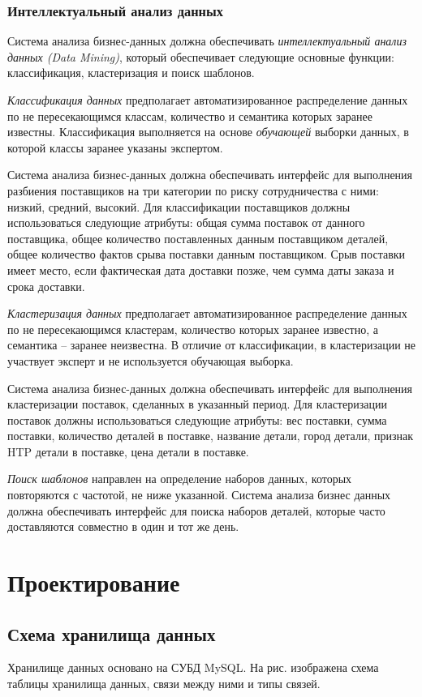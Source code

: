 \subsubsection{Интеллектуальный анализ данных}
Система анализа бизнес-данных должна обеспечивать \textit{интеллектуальный анализ данных (Data Mining)}, который обеспечивает следующие основные функции: классификация, кластеризация и поиск шаблонов.\par
\textit{Классификация данных} предполагает автоматизированное распределение данных по не пересекающимся классам, количество и семантика которых заранее известны. Классификация выполняется на основе \textit{обучающей} выборки данных, в которой классы заранее указаны экспертом.\par
Система анализа бизнес-данных должна обеспечивать интерфейс для выполнения разбиения поставщиков на три категории по риску сотрудничества с ними: низкий, средний, высокий. Для классификации поставщиков должны использоваться следующие атрибуты: общая сумма поставок от данного поставщика, общее количество поставленных данным поставщиком деталей, общее количество фактов срыва поставки данным поставщиком. Срыв поставки имеет место, если фактическая дата доставки позже, чем сумма даты заказа и срока доставки.\par
\textit{Кластеризация данных} предполагает автоматизированное распределение данных по не пересекающимся кластерам, количество которых заранее известно, а семантика – заранее неизвестна. В отличие от классификации, в кластеризации не участвует эксперт и не используется обучающая выборка.\par
Система анализа бизнес-данных должна обеспечивать интерфейс для выполнения кластеризации поставок, сделанных в указанный период. Для кластеризации поставок должны использоваться следующие атрибуты: вес поставки, сумма поставки, количество деталей в поставке, название детали, город детали, признак HTP детали в поставке, цена детали в поставке. \par
\textit{Поиск шаблонов} направлен на определение наборов данных, которых повторяются с частотой, не ниже указанной. Система анализа бизнес данных должна обеспечивать интерфейс для поиска наборов деталей, которые часто доставляются совместно в один и тот же день.

\section{Проектирование}
\subsection{Схема хранилища данных}
Хранилище данных основано на СУБД MySQL. На рис.  изображена схема таблицы хранилища данных, связи между ними и типы связей.

